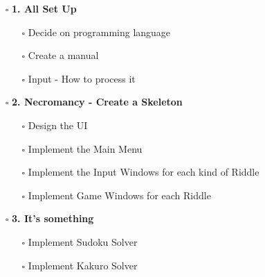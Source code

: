 \documentclass{article}
\begin{document}
	\begin{minipage}[t]{0.45\textwidth}
		\strut\vspace*{-\baselineskip}\newline
		\begin{itemize}
			\item[$\square$] \textbf{1. All Set Up}
			\begin{itemize}
				\item[\rlap{\checkmark}$\square$] Decide on programming language
				\item[$\square$] Create a manual
				\item[$\square$] Input - How to process it
			\end{itemize}
			\item[$\square$] \textbf{2. Necromancy - Create a Skeleton}
			\begin{itemize}
				\item[$\square$] Design the UI
				\item[$\square$] Implement the Main Menu
				\item[$\square$] Implement the Input Windows for each kind of Riddle
				\item[$\square$] Implement Game Windows for each Riddle
			\end{itemize}
			\item[$\square$] \textbf{3. It's something}
			\begin{itemize}
				\item[$\square$] Implement Sudoku Solver
				\item[$\square$] Implement Kakuro Solver
			\end{itemize}
		\end{itemize}
	\end{minipage}
	\hspace*{.1\textwidth}
\end{document}
